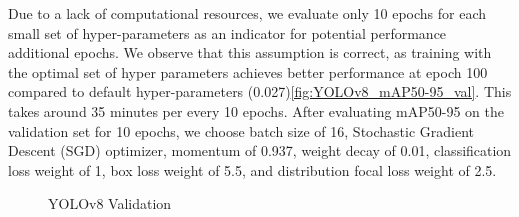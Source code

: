 \documentclass[10pt,twocolumn,letterpaper]{article}
\begin{document}
Due to a lack of computational resources, we evaluate only 10 epochs for each small set of hyper-parameters as an indicator for potential performance additional epochs. We observe that this assumption is correct, as training with the optimal set of hyper parameters achieves better performance at epoch 100 compared to default hyper-parameters (0.027)\ref{fig:YOLOv8_mAP50-95_val}. This takes around 35 minutes per every 10 epochs. After evaluating mAP50-95 on the validation set for 10 epochs, we choose batch size of 16, Stochastic Gradient Descent (SGD) optimizer, momentum of 0.937, weight decay of 0.01, classification loss weight of 1, box loss weight of 5.5, and distribution focal loss weight of 2.5.

\begin{figure}[h]
    \centering
    \qquad
    \caption{YOLOv8 Validation}%
    \label{fig:Model_Evaluation}
\end{figure}
\end{document}
